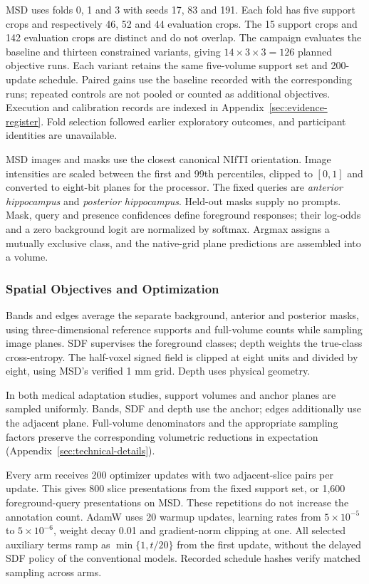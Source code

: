 \documentclass[12pt,a4paper]{article}
\begin{document}
MSD uses folds 0, 1 and 3 with seeds 17, 83 and 191. Each fold has five
support crops and respectively 46, 52 and 44 evaluation crops. The 15
support crops and 142 evaluation crops are distinct and do not overlap.
The campaign evaluates the baseline and thirteen constrained variants,
giving $14\times3\times3=126$ planned objective runs. Each variant
retains the same five-volume support set and 200-update schedule.
Paired gains use the baseline recorded with the corresponding runs;
repeated controls are not pooled or counted as additional objectives.
Execution and calibration records are indexed in
Appendix~\ref{sec:evidence-register}. Fold selection followed earlier
exploratory outcomes, and participant identities are unavailable.

MSD images and masks use the closest canonical NIfTI orientation.
Image intensities are scaled
between the first and 99th percentiles, clipped to $[0,1]$ and converted
to eight-bit planes for the processor. The fixed queries are
\emph{anterior hippocampus} and \emph{posterior hippocampus}.
Held-out masks supply no prompts.
Mask, query and presence confidences define foreground responses;
their log-odds and a zero background logit are normalized by softmax.
Argmax assigns a mutually exclusive class, and the native-grid plane
predictions are assembled into a volume.

\subsubsection{Spatial Objectives and Optimization}

Bands and edges average the separate background, anterior and
posterior masks, using three-dimensional reference supports and
full-volume counts while sampling image planes. SDF supervises the
foreground classes; depth weights the true-class cross-entropy.
The half-voxel signed field is clipped at eight units and divided by
eight, using MSD's verified 1 mm grid. Depth uses physical geometry.

In both medical adaptation studies, support volumes and anchor planes
are sampled uniformly. Bands, SDF
and depth use the anchor; edges additionally use the adjacent plane.
Full-volume denominators and the appropriate sampling factors preserve
the corresponding volumetric reductions in expectation
(Appendix~\ref{sec:technical-details}).

Every arm receives 200 optimizer updates with two adjacent-slice pairs
per update. This gives 800 slice presentations from the fixed support
set, or 1,600 foreground-query presentations on MSD.
These repetitions do not increase the annotation count. AdamW uses
20 warmup updates, learning rates from $5\times10^{-5}$ to
$5\times10^{-6}$, weight decay 0.01 and gradient-norm clipping at one.
All selected auxiliary terms ramp as $\min\{1,t/20\}$ from the first
update, without the delayed SDF policy of the conventional models.
Recorded schedule hashes verify matched sampling across arms.
\end{document}
